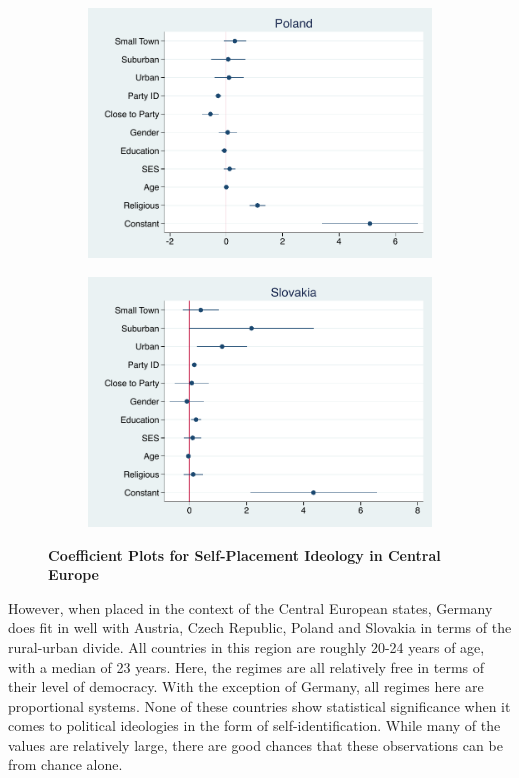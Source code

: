 \documentclass[12pt, titlepage]{article}
\newcommand\tb{\textbf}
\begin{document}
\begin{figure}[H]
\begin{subfigure}[b]{0.475\textwidth}
		\includegraphics[width=\textwidth]{IdeologyCoef/Poland}
	\end{subfigure}
	\quad
	\begin{subfigure}[b]{0.475\textwidth}   
		\centering 
		\includegraphics[width=\textwidth]{IdeologyCoef/Slovakia}
	\end{subfigure}
	\caption[ \tb{Self-Placement Ideology - Central Europe} ]
	{\tb {Coefficient Plots for Self-Placement Ideology in Central Europe} }
	\label{CentEuroIdeo}
\end{figure}


However, when placed in the context of the Central European states, Germany does fit in well with Austria, Czech Republic, Poland and Slovakia in terms of the rural-urban divide. All countries in this region are roughly 20-24 years of age, with a median of 23 years. Here, the regimes are all relatively free in terms of their level of democracy. With the exception of Germany, all regimes here are proportional systems. None of these countries show statistical significance when it comes to political ideologies in the form of self-identification. While many of the values are relatively large, there are good chances that these observations can be from chance alone. 
\end{document}
